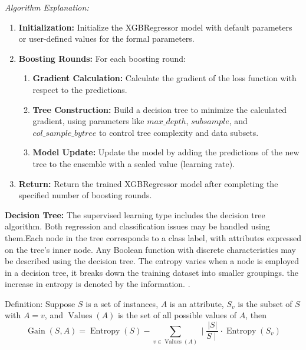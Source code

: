 \documentclass[conference]{IEEEtran}
\begin{document}
\textit{Algorithm Explanation:}
\begin{enumerate}
    \item \textbf{Initialization:} Initialize the XGBRegressor model with default parameters or user-defined values for the formal parameters.
    \item \textbf{Boosting Rounds:} For each boosting round:
        \begin{enumerate}
            \item \textbf{Gradient Calculation:} Calculate the gradient of the loss function with respect to the predictions.
            \item \textbf{Tree Construction:} Build a decision tree to minimize the calculated gradient, using parameters like $max\_depth$, $subsample$, and $col\_sample\_bytree$ to control tree complexity and data subsets.
            \item \textbf{Model Update:} Update the model by adding the predictions of the new tree to the ensemble with a scaled value (learning rate).
        \end{enumerate}
    \item \textbf{Return:} Return the trained XGBRegressor model after completing the specified number of boosting rounds.
\end{enumerate}

\newline
\item \textbf{   Decision Tree:}
\newline
The supervised learning type includes the decision tree algorithm. Both regression and classification issues may be handled using them.Each node in the tree corresponds to a class label, with attributes expressed on the tree's inner node. Any Boolean function with discrete characteristics may be described using the decision tree. The entropy varies when a node is employed in a decision tree, it breaks down the training dataset into smaller groupings. the increase in entropy is denoted by the information. \textcolor{blue}{\citep{shouman2011using}}. 

Definition: Suppose $S$ is a set of instances, $A$ is an attribute, $S_{v}$ is the subset of $S$ with $A=v$, and $\operatorname{Values}(A)$ is the set of all possible values of $A$, then
\begin{equation}
\operatorname{Gain}(S, A)=\operatorname{Entropy}(S)-\sum_{v \in \operatorname{Values}(A)} \mid \frac{|S|}{S \mid} \cdot \operatorname{Entropy}\left(S_{v}\right)
\end{equation}
\end{document}
